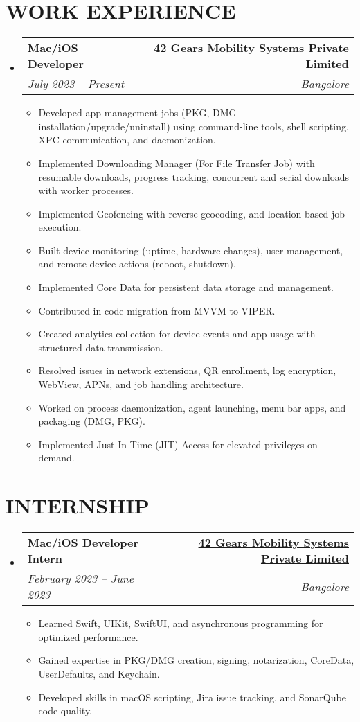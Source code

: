 \documentclass[letterpaper,11pt]{article}
\makeatletter
\newcommand{\resumeItem}[1]{
  \item\small{
    {#1 \vspace{-2pt}}
  }
}
\newcommand{\resumeSubheading}[4]{
  \vspace{-2pt}\item
    \begin{tabular*}{1.0\textwidth}[t]{l@{\extracolsep{\fill}}r}
      \textbf{\large#1} & \textbf{\small #2} \\
      \textit{\large#3} & \textit{\small #4} \\
      
    \end{tabular*}\vspace{-7pt}
}
\newcommand{\resumeSubHeadingListStart}{\begin{itemize}[leftmargin=0.0in, label={}]}
\newcommand{\resumeSubHeadingListEnd}{\end{itemize}}
\newcommand{\resumeItemListStart}{\begin{itemize}}
\newcommand{\resumeItemListEnd}{\end{itemize}\vspace{-5pt}}
\makeatother
\begin{document}
\section{WORK EXPERIENCE}
    \resumeSubHeadingListStart
        \resumeSubheading{Mac/iOS Developer}{\href{https://www.42gears.com/}{42 Gears Mobility Systems Private Limited}}{July 2023 -- Present}{Bangalore}
        \vspace{2pt}
            \resumeItemListStart
                \resumeItem{\normalsize{Developed app management jobs (PKG, DMG installation/upgrade/uninstall) using command-line tools, shell scripting, XPC communication, and daemonization.}}
                \resumeItem{\normalsize{Implemented Downloading Manager (For File Transfer Job) with resumable downloads, progress tracking, concurrent and serial downloads with worker processes.}}
                \resumeItem{\normalsize{Implemented Geofencing with reverse geocoding, and location-based job execution.}}
                \resumeItem{\normalsize{Built device monitoring (uptime, hardware changes), user management, and remote device actions (reboot, shutdown).}}
                \resumeItem{\normalsize{Implemented Core Data for persistent data storage and management.}}
                \resumeItem{\normalsize{Contributed in code migration from MVVM to VIPER.}}
                \resumeItem{\normalsize{Created analytics collection for device events and app usage with structured data transmission.}}
                \resumeItem{\normalsize{Resolved issues in network extensions, QR enrollment, log encryption, WebView, APNs, and job handling architecture.}}
                \resumeItem{\normalsize{Worked on process daemonization, agent launching, menu bar apps, and packaging (DMG, PKG).}}
                \resumeItem{\normalsize{Implemented Just In Time (JIT) Access for elevated privileges on demand.}}
            \resumeItemListEnd
    \resumeSubHeadingListEnd

\section{INTERNSHIP}
    \resumeSubHeadingListStart
        \resumeSubheading{Mac/iOS Developer Intern}{\href{https://www.42gears.com/}{42 Gears Mobility Systems Private Limited}}{February 2023 -- June 2023}{Bangalore}
        \vspace{2pt}
            \resumeItemListStart
                \resumeItem{\normalsize{Learned Swift, UIKit, SwiftUI, and asynchronous programming for optimized performance.}}
                \resumeItem{\normalsize{Gained expertise in PKG/DMG creation, signing, notarization, CoreData, UserDefaults, and Keychain.}}
                \resumeItem{\normalsize{Developed skills in macOS scripting, Jira issue tracking, and SonarQube code quality.}}
            \resumeItemListEnd
    \resumeSubHeadingListEnd
\end{document}
